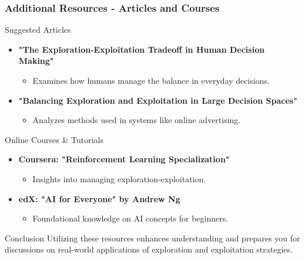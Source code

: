 \documentclass[aspectratio=169]{beamer}
\begin{document}
\begin{frame}[fragile]
    \frametitle{Additional Resources - Articles and Courses}

    \begin{block}{Suggested Articles}
        \begin{itemize}
            \item \textbf{"The Exploration-Exploitation Tradeoff in Human Decision Making"}
                \begin{itemize}
                    \item Examines how humans manage the balance in everyday decisions.
                \end{itemize}
            \item \textbf{"Balancing Exploration and Exploitation in Large Decision Spaces"}
                \begin{itemize}
                    \item Analyzes methods used in systems like online advertising.
                \end{itemize}
        \end{itemize}
    \end{block}

    \begin{block}{Online Courses \& Tutorials}
        \begin{itemize}
            \item \textbf{Coursera: "Reinforcement Learning Specialization"}
                \begin{itemize}
                    \item Insights into managing exploration-exploitation.
                \end{itemize}
            \item \textbf{edX: "AI for Everyone" by Andrew Ng}
                \begin{itemize}
                    \item Foundational knowledge on AI concepts for beginners.
                \end{itemize}
        \end{itemize}
    \end{block}
    
    \begin{block}{Conclusion}
        Utilizing these resources enhances understanding and prepares you for discussions on real-world applications of exploration and exploitation strategies.
    \end{block}
\end{frame}
\end{document}
